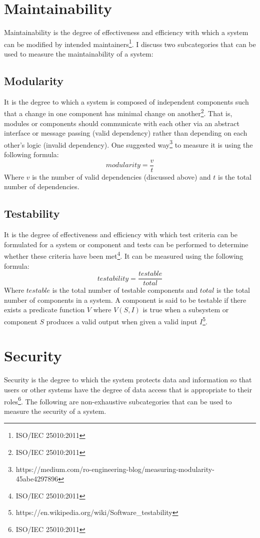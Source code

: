 \documentclass[11pt,a4paper]{article}
\def \iso{\footnote{ISO/IEC 25010:2011}}
\begin{document}
\section{Maintainability}
Maintainability is the degree of effectiveness and efficiency with which a system can be modified by intended
maintainers\iso. I discuss two subcategories that can be used to measure the maintainability of a system:

\subsection{Modularity}
It is the degree to which a system is composed of independent components such that a change in one component
has minimal change on another\iso.
That is, modules or components should communicate with each other via an abstract interface or message passing
(valid dependency) rather than depending on each other's logic (invalid dependency).
One suggested way\footnote{https://medium.com/ro-engineering-blog/measuring-modularity-45abe4297896} to measure it
is using the following formula:
\[modularity = \frac{v}{t}\]
Where $v$ is the number of valid dependencies (discussed above) and $t$ is the total number of dependencies.

\subsection{Testability}
It is the degree of effectiveness and efficiency with which test criteria can be formulated for a system or component
and tests can be performed to determine whether these criteria have been met\iso.
It can be measured using the following formula:
\[testability = \frac{testable}{total}\]
Where $testable$ is the total number of testable components and $total$ is the total number of components in a system.
A component is said to be testable if there exists a predicate function $V$ where $V(S, I)$ is true
when a subsystem or component $S$ produces a valid output when given a valid input
$I$\footnote{https://en.wikipedia.org/wiki/Software\_testability}.

\section{Security}
Security is the degree to which the system protects data and information
so that users or other systems have the degree of data access that is appropriate to their roles\iso.
The following are non-exhaustive subcategories that can be used to measure the security of a system.
\end{document}
